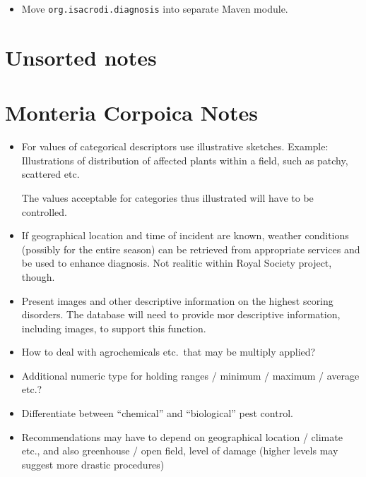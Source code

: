 \documentclass[a4paper,fleqn]{article}
\newcommand{\computercode}[1]{\texttt{#1}}
\begin{document}
\begin{itemize}

\item Move \computercode{org.isacrodi.diagnosis} into separate Maven
  module.

\end{itemize}


\section{Unsorted notes}

\section{Monteria Corpoica Notes}

\begin{itemize}

\item For values of categorical descriptors use illustrative sketches.
  Example: Illustrations of distribution of affected plants within a
  field, such as patchy, scattered etc.

  The values acceptable for categories thus illustrated will have to
  be controlled.

\item If geographical location and time of incident are known, weather
  conditions (possibly for the entire season) can be retrieved from
  appropriate services and be used to enhance diagnosis. Not realitic
  within Royal Society project, though.

\item Present images and other descriptive information on the highest
  scoring disorders. The database will need to provide mor descriptive
  information, including images, to support this function.

\item How to deal with agrochemicals etc.\ that may be multiply
  applied?

\item Additional numeric type for holding ranges / minimum / maximum /
  average etc.?

\item Differentiate between ``chemical'' and ``biological'' pest
  control.

\item Recommendations may have to depend on geographical location /
  climate etc., and also greenhouse / open field, level of damage
  (higher levels may suggest more drastic procedures)


\end{itemize}
\end{document}
